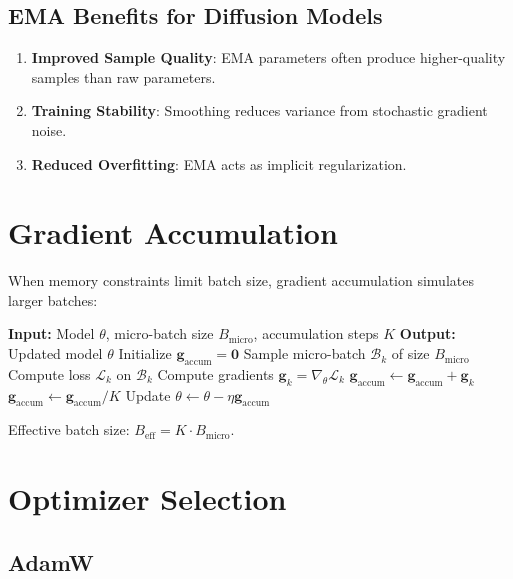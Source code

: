 \documentclass[12pt]{report}
\theoremstyle{definition}
\newcommand{\loss}{\mathcal{L}}
\begin{document}
\subsection{EMA Benefits for Diffusion Models}

\begin{enumerate}
\item \textbf{Improved Sample Quality}: EMA parameters often produce higher-quality samples than raw parameters.
\item \textbf{Training Stability}: Smoothing reduces variance from stochastic gradient noise.
\item \textbf{Reduced Overfitting}: EMA acts as implicit regularization.
\end{enumerate}

\section{Gradient Accumulation}

When memory constraints limit batch size, gradient accumulation simulates larger batches:

\begin{algorithm}[H]
\caption{Gradient Accumulation}
\label{alg:grad_accum}
\begin{algorithmic}[1]
\STATE \textbf{Input:} Model $\theta$, micro-batch size $B_{\text{micro}}$, accumulation steps $K$
\STATE \textbf{Output:} Updated model $\theta$
\STATE Initialize $\mathbf{g}_{\text{accum}} = \mathbf{0}$
    \STATE Sample micro-batch $\mathcal{B}_k$ of size $B_{\text{micro}}$
    \STATE Compute loss $\loss_k$ on $\mathcal{B}_k$
    \STATE Compute gradients $\mathbf{g}_k = \nabla_\theta \loss_k$
    \STATE $\mathbf{g}_{\text{accum}} \leftarrow \mathbf{g}_{\text{accum}} + \mathbf{g}_k$
\ENDFOR
\STATE $\mathbf{g}_{\text{accum}} \leftarrow \mathbf{g}_{\text{accum}} / K$
\STATE Update $\theta \leftarrow \theta - \eta \mathbf{g}_{\text{accum}}$
\end{algorithmic}
\end{algorithm}

Effective batch size: $B_{\text{eff}} = K \cdot B_{\text{micro}}$.

\section{Optimizer Selection}

\subsection{AdamW}
\end{document}
